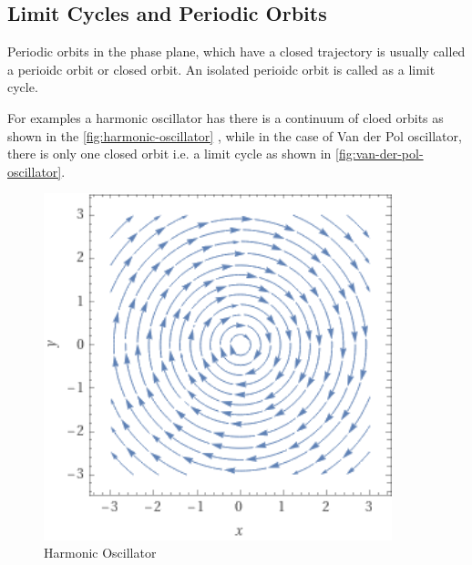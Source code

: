 \subsection{Limit Cycles and Periodic Orbits}

Periodic orbits in the phase plane, which have a closed trajectory is usually 
called a perioidc orbit or closed orbit. An isolated perioidc orbit is called as a limit cycle.

For examples a harmonic oscillator has there is a continuum of cloed orbits as 
shown in the \autoref{fig:harmonic-oscillator}
, while in the case 
of Van der Pol oscillator, there is only one closed orbit i.e. a limit cycle as shown in
\autoref{fig:van-der-pol-oscillator}.

\begin{minipage}
    {0.5\textwidth}
    \begin{figure}[H]
        \centering
        \includegraphics[width=0.9\textwidth]{figures/phaseportraits/osc.png}
        \caption{Harmonic Oscillator}
        \label{fig:harmonic-oscillator}
    \end{figure}
\end{minipage}
